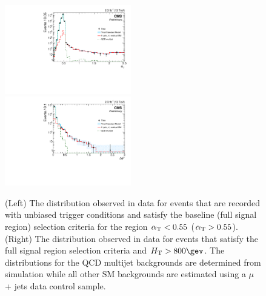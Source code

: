 \begin{figure}[tbhp]
  \begin{center}
    \includegraphics[width=0.49\textwidth]{AlphaT_v6} \,
    \includegraphics[width=0.49\textwidth]{bDPhi_v6} \\
  \end{center}
  \caption{(Left) The \alphat distribution observed in data for events
    that are recorded with unbiased trigger conditions and satisfy the
    baseline (full signal region) selection criteria for the region
    $\alpha_{\text{T}} < 0.55$ ($\alpha_{\text{T}} > 0.55$). (Right) The \bdphi
    distribution observed in data for events that satisfy the full
    signal region selection criteria and $\scalht > 800\gev$.  The
    distributions for the QCD multijet backgrounds are determined from
    simulation while all other SM backgrounds are estimated using a
    $\mu$ + jets data control sample. %
    \label{fig:alphat-bdphi} 
  }
\end{figure}


